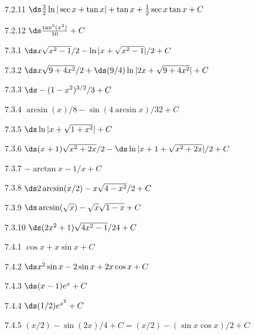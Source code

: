 \begin{Answer}{7.2.11}
 $\ds \frac{3}{2}\ln|\sec x+\tan x|+\tan x+\frac{1}{2}\sec x\tan x+C$
\end{Answer}
\begin{Answer}{7.2.12}
 $\ds \frac{\tan^5(x^2)}{10}+C$
\end{Answer}
\begin{Answer}{7.3.1}
 $\ds x\sqrt{x^2-1}/2-\ln|x+\sqrt{x^2-1}|/2+C$
\end{Answer}
\begin{Answer}{7.3.2}
 $\ds x\sqrt{9+4x^2}/2+\hbox{$\ds(9/4)\ln|2x+\sqrt{9+4x^2}|+C$}$
\end{Answer}
\begin{Answer}{7.3.3}
 $\ds -(1-x^2)^{3/2}/3+C$
\end{Answer}
\begin{Answer}{7.3.4}
 $\arcsin(x)/8-\sin(4\arcsin x)/32+C$
\end{Answer}
\begin{Answer}{7.3.5}
 $\ds \ln|x+\sqrt{1+x^2}|+C$
\end{Answer}
\begin{Answer}{7.3.6}
 $\ds (x+1)\sqrt{x^2+2x}/2-\hbox{$\ds\ln|x+1+\sqrt{x^2+2x}|/2+C$}$
\end{Answer}
\begin{Answer}{7.3.7}
 $-\arctan x - 1/x+C$
\end{Answer}
\begin{Answer}{7.3.8}
 $\ds 2\arcsin(x/2)-x\sqrt{4-x^2}/2+C$
\end{Answer}
\begin{Answer}{7.3.9}
 $\ds \arcsin(\sqrt{x})-\sqrt{x}\sqrt{1-x}+C$
\end{Answer}
\begin{Answer}{7.3.10}
 $\ds (2x^2+1)\sqrt{4x^2-1}/24+C$
\end{Answer}
\begin{Answer}{7.4.1}
 $\cos x+x\sin x+C$
\end{Answer}
\begin{Answer}{7.4.2}
 $\ds x^2\sin x-2 \sin x+2x\cos x +C$
\end{Answer}
\begin{Answer}{7.4.3}
 $\ds (x-1)e^x +C$
\end{Answer}
\begin{Answer}{7.4.4}
 $\ds (1/2)e^{x^2} +C$
\end{Answer}
\begin{Answer}{7.4.5}
 $(x/2)-\sin(2x)/4 +C=$\hfill\break$(x/2)-(\sin x\cos x)/2+C$
\end{Answer}
